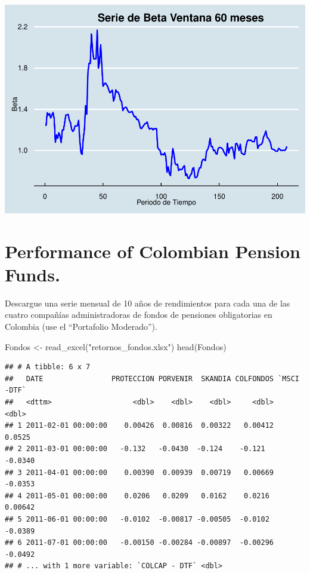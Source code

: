 \documentclass[
  12pt,
]{article}
\newenvironment{Shaded}{\begin{snugshade}}{\end{snugshade}}
\newcommand{\FunctionTok}[1]{\textcolor[rgb]{0.00,0.00,0.00}{#1}}
\newcommand{\NormalTok}[1]{#1}
\newcommand{\OtherTok}[1]{\textcolor[rgb]{0.56,0.35,0.01}{#1}}
\newcommand{\StringTok}[1]{\textcolor[rgb]{0.31,0.60,0.02}{#1}}
\begin{document}
\begin{center}\includegraphics[width=0.95\linewidth]{figurasR/unnamed-chunk-18-1} \end{center}

\hypertarget{performance-of-colombian-pension-funds.}{%
\section{Performance of Colombian Pension
Funds.}\label{performance-of-colombian-pension-funds.}}

Descargue una serie mensual de 10 años de rendimientos para cada una de
las cuatro compañías administradoras de fondos de pensiones obligatorias
en Colombia (use el ``Portafolio Moderado'').

\begin{Shaded}
\begin{Highlighting}[]
\NormalTok{Fondos }\OtherTok{\textless{}{-}} \FunctionTok{read\_excel}\NormalTok{(}\StringTok{"retornos\_fondos.xlsx"}\NormalTok{)}
\FunctionTok{head}\NormalTok{(Fondos)}
\end{Highlighting}
\end{Shaded}

\begin{verbatim}
## # A tibble: 6 x 7
##   DATE                PROTECCION PORVENIR  SKANDIA COLFONDOS `MSCI -DTF`
##   <dttm>                   <dbl>    <dbl>    <dbl>     <dbl>       <dbl>
## 1 2011-02-01 00:00:00    0.00426  0.00816  0.00322   0.00412     0.0525 
## 2 2011-03-01 00:00:00   -0.132   -0.0430  -0.124    -0.121      -0.0340 
## 3 2011-04-01 00:00:00    0.00390  0.00939  0.00719   0.00669    -0.0353 
## 4 2011-05-01 00:00:00    0.0206   0.0209   0.0162    0.0216      0.00642
## 5 2011-06-01 00:00:00   -0.0102  -0.00817 -0.00505  -0.0102     -0.0389 
## 6 2011-07-01 00:00:00   -0.00150 -0.00284 -0.00897  -0.00296    -0.0492 
## # ... with 1 more variable: `COLCAP - DTF` <dbl>
\end{verbatim}
\end{document}
